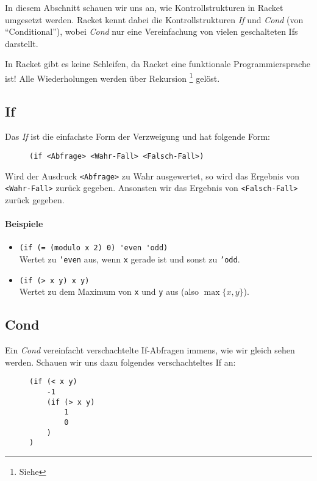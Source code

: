 
In diesem Abschnitt schauen wir uns an, wie Kontrollstrukturen in Racket umgesetzt werden. Racket kennt dabei die Kontrollstrukturen \textit{If} und \textit{Cond} (von \enquote{Conditional}), wobei \textit{Cond} nur eine Vereinfachung von vielen geschalteten Ifs darstellt.

In Racket gibt es keine Schleifen, da Racket eine funktionale Programmiersprache ist! Alle Wiederholungen werden über Rekursion \footnote{Siehe } gelöst.

\subsection{If}
	Das \textit{If} ist die einfachste Form der Verzweigung und hat folgende Form:
	\begin{figure}[H]
		\centering
		\lstinline[language = Racket]|(if <Abfrage> <Wahr-Fall> <Falsch-Fall>)|
	\end{figure}
	Wird der Ausdruck \texttt{<Abfrage>} zu Wahr ausgewertet, so wird das Ergebnis von \texttt{<Wahr-Fall>} zurück gegeben. Ansonsten wir das Ergebnis von \texttt{<Falsch-Fall>} zurück gegeben.
	
	
	\paragraph{Beispiele}
		\begin{itemize}
			\item \lstinline[language = Racket]|(if (= (modulo x 2) 0) 'even 'odd)| \\
				  Wertet zu \texttt{'even} aus, wenn \texttt{x} gerade ist und sonst zu \texttt{'odd}.
			\item \lstinline[language = Racket]|(if (> x y) x y)| \\
				  Wertet zu dem Maximum von \texttt{x} und \texttt{y} aus (also \( \max \{ x, y \} \)).
		\end{itemize}

\subsection{Cond}
	Ein \textit{Cond} vereinfacht verschachtelte If-Abfragen immens, wie wir gleich sehen werden. Schauen wir uns dazu folgendes verschachteltes If an:
	\begin{figure}[H]
		\centering
		\begin{lstlisting}[language = Racket]
(if (< x y)
	-1
	(if (> x y)
		1
		0
	)
)
\end{lstlisting}
	\end{figure}

